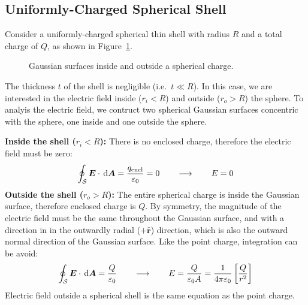 \subsection{Uniformly-Charged Spherical Shell}
Consider a uniformly-charged spherical thin shell with radius $R$ and a total
charge of $Q$, as shown in Figure~\ref{fig:spherical-charged-shell}.
\begin{figure}[ht]
  \centering
  \caption{Gaussian surfaces inside and outside a spherical charge.}
  \label{fig:spherical-charged-shell}
\end{figure}
The thickness $t$ of the shell is negligible (i.e.\ $t\ll R$). In this case, we
are interested in the electric field inside ($r_i<R$) and outside ($r_o>R$) the
sphere. To analyis the electric field, we contruct two spherical Gaussian
surfaces concentric with the sphere, one inside and one outside the sphere.

\textbf{Inside the shell ($r_i<R$):} There is no enclosed charge, therefore
the electric field must be zero:
\begin{equation*}
  \oint_{\mathcal S}\bm E\cdot\dl{\bm A}=\frac{q_\text{encl}}{\varepsilon_0}=0
  \quad\quad\longrightarrow\quad\quad E=0
\end{equation*}
\textbf{Outside the shell ($r_o>R$):} The entire spherical charge is inside the
Gaussian surface, therefore enclosed charge is $Q$. By symmetry, the magnitude
of the electric field must be the same throughout the Gaussian surface, and
with a direction in in the outwardly radial ($+\hat{\bm r}$) direction, which
is also the outward normal direction of the Gaussian surface. Like the point
charge, integration can be avoid:
\begin{equation}
  \oint_{\mathcal S}\bm E\cdot\dl{\bm A}=\frac Q{\varepsilon_0}
  \quad\quad\longrightarrow\quad\quad E=\frac Q{\varepsilon_0A}
  =\frac1{4\pi\varepsilon_0}\left[\frac Q{r^2}\right]
\end{equation}
Electric field outside a spherical shell is the same equation as the point
charge.

